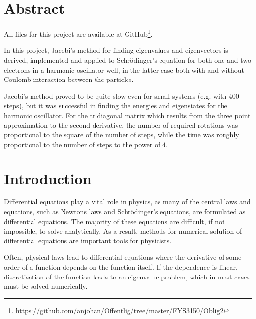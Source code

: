 \documentclass[12pt,english,a4paper]{report}
\begin{document}

\pagestyle{fancy}
\tableofcontents

%

\section{Abstract}

All files for this project are available at GitHub\footnote{\url{https://github.com/anjohan/Offentlig/tree/master/FYS3150/Oblig2}}.

In this project, Jacobi's method for finding eigenvalues and eigenvectors is derived, implemented and applied to Schrödinger's equation for both one and two electrons in a harmonic oscillator well, in the latter case both with and without Coulomb interaction between the particles.

Jacobi's method proved to be quite slow even for small systems (e.g. with \(400\) steps), but it was successful in finding the energies and eigenstates for the harmonic oscillator. For the tridiagonal matrix which results from the three point approximation to the second derivative, the number of required rotations was proportional to the square of the number of steps, while the time was roughly proportional to the number of steps to the power of \(4\).

%

\section{Introduction}
Differential equations play a vital role in physics, as many of the central laws and equations, such as Newtons laws and Schrödinger's equations, are formulated as differential equations. The majority of these equations are difficult, if not impossible, to solve analytically. As a result, methods for numerical solution of differential equations are important tools for physicists.

Often, physical laws lead to differential equations where the derivative of some order of a function depends on the function itself. If the dependence is linear, discretisation of the function leads to an eigenvalue problem, which in most cases must be solved numerically.
\end{document}
